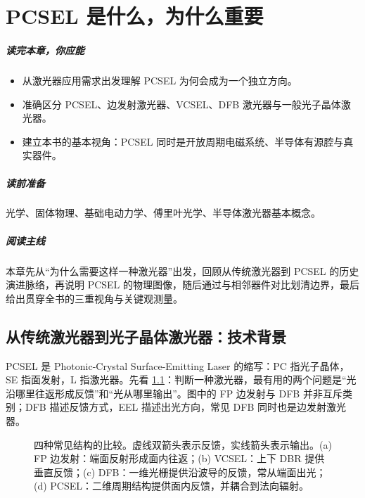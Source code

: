 ﻿%
\chapter{PCSEL 是什么，为什么重要}
\label{ch:introduction}

\paragraph{读完本章，你应能}
\begin{itemize}
  \item 从激光器应用需求出发理解 PCSEL 为何会成为一个独立方向。
  \item 准确区分 PCSEL、边发射激光器、VCSEL、DFB 激光器与一般光子晶体激光器。
  \item 建立本书的基本视角：PCSEL 同时是开放周期电磁系统、半导体有源腔与真实器件。
\end{itemize}

\paragraph{读前准备}
光学、固体物理、基础电动力学、傅里叶光学、半导体激光器基本概念。

\paragraph{阅读主线}
本章先从“为什么需要这样一种激光器”出发，回顾从传统激光器到 PCSEL 的历史演进脉络，再说明 PCSEL 的物理图像，随后通过与相邻器件对比划清边界，最后给出贯穿全书的三重视角与关键观测量。

\section{从传统激光器到光子晶体激光器：技术背景}
\label{sec:historical-evolution}

PCSEL 是 Photonic-Crystal Surface-Emitting Laser 的缩写：PC 指光子晶体，SE 指面发射，L 指激光器。先看 \cref{fig:ch01_laser_comparison}：判断一种激光器，最有用的两个问题是“光沿哪里往返形成反馈”和“光从哪里输出”。图中的 FP 边发射与 DFB 并非互斥类别；DFB 描述反馈方式，EEL 描述出光方向，常见 DFB 同时也是边发射激光器。

\begin{figure}[htbp]
  \centering
  
  \caption{四种常见结构的比较。虚线双箭头表示反馈，实线箭头表示输出。(a) FP 边发射：端面反射形成面内往返；(b) VCSEL：上下 DBR 提供垂直反馈；(c) DFB：一维光栅提供沿波导的反馈，常从端面出光；(d) PCSEL：二维周期结构提供面内反馈，并耦合到法向辐射。}
  \label{fig:ch01_laser_comparison}
\end{figure}

